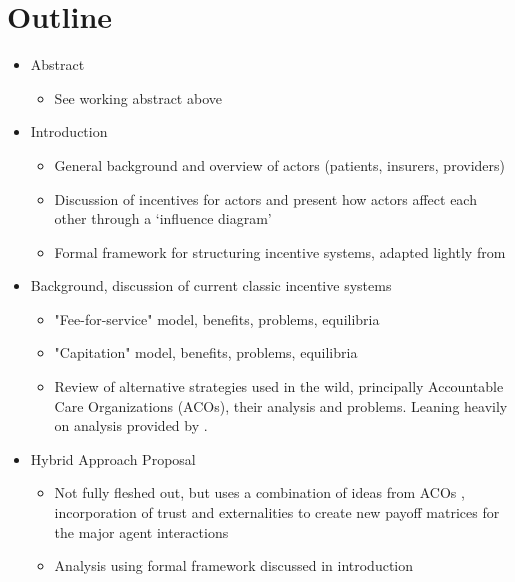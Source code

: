 \documentclass{article}
\begin{document}
\section*{Outline}

\begin{itemize}
    \item Abstract
        \begin{itemize}
            \item See working abstract above
        \end{itemize}
    \item Introduction
        \begin{itemize}
            \item General background and overview of actors (patients, insurers, providers)
            \item Discussion of incentives for actors and present how actors affect each other through a `influence diagram'
            \item Formal framework for structuring incentive systems, adapted lightly from \cite{blended}
        \end{itemize}
    \item Background, discussion of current classic incentive systems
        \begin{itemize}
            \item "Fee-for-service" model, benefits, problems, equilibria
            \item "Capitation" model, benefits, problems, equilibria
            \item Review of alternative strategies used in the wild, principally Accountable Care Organizations (ACOs), their analysis and problems. Leaning heavily on analysis provided by \cite{msdt}.
        \end{itemize}
    \item Hybrid Approach Proposal
        \begin{itemize}
            \item Not fully fleshed out, but uses a combination of ideas from ACOs \cite{mdst}, incorporation of trust \cite{trust} and externalities \cite{blended} to create new payoff matrices for the major agent interactions
            \item Analysis using formal framework discussed in introduction
        \end{itemize}
\end{itemize}

\end{document}
